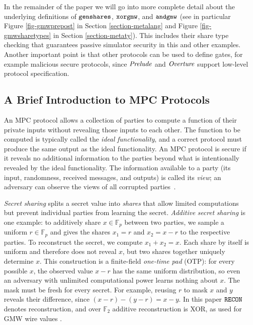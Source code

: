 In the remainder of the paper we will go into more complete detail
about the underlying definitions of $\texttt{genshares}$, $\texttt{xorgmw}$,
and $\texttt{andgmw}$ (see in particular Figure \ref{fig-gmwprepost} in
Section \ref{section-metalang} and Figure \ref{fig-gmwsharetypes} in
Section \ref{section-metaty}). This includes their share type checking that
guarantees passive simulator security in this and other examples.
Another important point is that other protocols can be used to define
gates, for example malicious secure protocols, since $\mathit{Prelude}$
and $\mathit{Overture}$ support low-level protocol specification.

\subsection{A Brief Introduction to MPC Protocols}

An MPC protocol allows a collection of parties to compute a function
of their private inputs without revealing those inputs to each other.
The function to be computed is typically called the \emph{ideal
  functionality}, and a correct protocol must produce the same output
as the ideal functionality. An MPC protocol is secure if it reveals no
additional information to the parties beyond what is intentionally
revealed by the ideal functionality. The information available to a
party (its input, randomness, received messages, and outputs) is
called its \emph{view}; an adversary can observe the views of all
corrupted parties~\cite{evans2018pragmatic,Lindell2017}.

\emph{Secret sharing} splits a secret value into \emph{shares} that
allow limited computations but prevent individual parties from
learning the secret. \emph{Additive secret sharing} is one example: to
additively share $x \in \mathbb{F}_p$ between two parties, we sample a
uniform $r \in \mathbb{F}_p$ and gives the shares $x_1=r$ and
$x_2=x-r$ to the respective parties. To reconstruct the secret, we
compute $x_1+x_2=x$. Each share by itself is uniform and therefore
does not reveal $x$, but two shares together uniquely determine $x$.
This construction is a finite-field \emph{one-time pad} (OTP): for
every possible $x$, the observed value $x-r$ has the same uniform
distribution, so even an adversary with unlimited computational power
learns nothing about $x$. The mask must be fresh for every secret. For
example, reusing $r$ to mask $x$ and $y$ reveals their difference,
since $(x-r)-(y-r)=x-y$. In this paper $\texttt{RECON}$ denotes
reconstruction, and over $\mathbb{F}_2$ additive reconstruction is
XOR, as used for GMW wire values \cite{goldreich1987play, evans2018pragmatic}.

